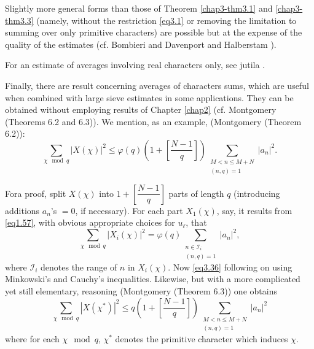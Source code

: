 Slightly more general forms than those of Theorem \ref{chap3-thm3.1}
and \ref{chap3-thm3.3} 
(namely, without the restriction \eqref{eq3.1} or removing the limitation to
summing over only primitive characters) are possible but at the
expense of the quality of the estimates (cf. Bombieri \cite{key1} and
Davenport and Halberstam \cite{key1}). 

For an estimate of averages involving real characters only, see jutila
\cite{key6}. 

Finally, there are result concerning averages of characters sums,
which are useful when combined with large sieve estimates in some
applications. They can be obtained without employing results of
Chapter \ref{chap2} (cf. Montgomery \cite{key5}  (Theorems
6.2 and 6.3)). We 
mention, as an example, (Montgomery \cite{key5} (Theorem
6.2)):  
\begin{equation*}
\sum_{\chi \mod q} |X(\chi)|^2 \leq \varphi (q)
(1+\left[\frac{N-1}{q}\right]) \sum_{\substack{M < n \leq M + N
    \\ (n,q) =1}} |a_n|^2. \tag{3.36}\label{eq3.36} 
\end{equation*}

For\pageoriginale a proof, split $X(\chi)$ into $1+ \left[
  \dfrac{N-1}{q}\right]$ parts of length $q$ (introducing additions
$a_n$'s $= 0$, if necessary). For each part $X_1(\chi)$, say, it results
from \eqref{eq1.57}, with obvious appropriate choices for $u_\ell$, that 
\begin{equation*}
\sum_{\chi \mod q} |X_i(\chi)|^2  = \varphi (q) \sum_{\substack{n \in
    \mathscr{I}_i \\ (n,q)=1}} |a_n|^2, \tag{3.37}\label{eq3.37} 
\end{equation*}
where $\mathscr{I}_i$ denotes the range of $n$ in $X_i(\chi)$. Now \eqref{eq3.36}
following on using Minkowski's and Cauchy's inequalities. Likewise,
but with a more complicated yet still elementary, reasoning
(Montgomery \cite{key5} (Theorem 6.3)) one obtains    
\begin{equation*}
\sum_{\chi \mod q} |X (\chi^*)|^2 \leq q(1+ \left[\frac{N-1}{q}\right]
) \sum_{\substack{M < n \leq M+N \\ (n,q) =1}} |a_n|^2
\tag{3.38}\label{eq3.38} 
\end{equation*}
where for each $\chi \mod q$, $\chi^*$ denotes the primitive character
which induces $\chi$. 
